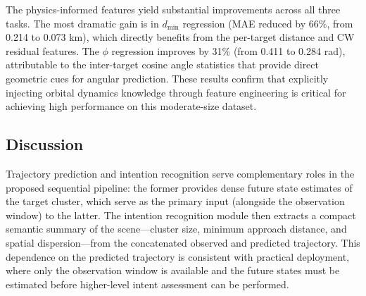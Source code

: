\documentclass[a4paper,fleqn]{cas-dc}
\begin{document}
The physics-informed features yield substantial improvements across all three tasks. The most dramatic gain is in $d_{\min}$ regression (MAE reduced by 66\%, from 0.214 to 0.073 km), which directly benefits from the per-target distance and CW residual features. The $\phi$ regression improves by 31\% (from 0.411 to 0.284 rad), attributable to the inter-target cosine angle statistics that provide direct geometric cues for angular prediction. These results confirm that explicitly injecting orbital dynamics knowledge through feature engineering is critical for achieving high performance on this moderate-size dataset.

\subsection{Discussion}

Trajectory prediction and intention recognition serve complementary roles in the proposed sequential pipeline: the former provides dense future state estimates of the target cluster, which serve as the primary input (alongside the observation window) to the latter. The intention recognition module then extracts a compact semantic summary of the scene---cluster size, minimum approach distance, and spatial dispersion---from the concatenated observed and predicted trajectory. This dependence on the predicted trajectory is consistent with practical deployment, where only the observation window is available and the future states must be estimated before higher-level intent assessment can be performed.
\end{document}
